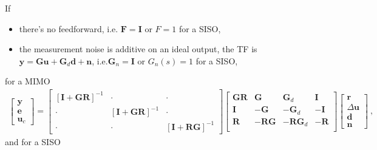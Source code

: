 \documentclass[letterpaper,10pt,english]{jupyterBook}
\begin{document}
\sphinxAtStartPar
{} If
\begin{itemize}
\item {} 
\sphinxAtStartPar
there’s no feed\sphinxhyphen{}forward, i.e. \(\mathbf{F} = \mathbf{I}\) or \(F = 1\) for a SISO,

\item {} 
\sphinxAtStartPar
the measurement noise is additive on an ideal output, the TF is \(\mathbf{y} = \mathbf{G} \mathbf{u} + \mathbf{G}_d \mathbf{d} + \mathbf{n}\), i.e.\(\mathbf{G}_n = \mathbf{I}\) or \(G_n(s) = 1\) for a SISO,

\end{itemize}

\sphinxAtStartPar
for a MIMO
\begin{equation*}
\begin{split}
\begin{bmatrix} \mathbf{y} \\ \mathbf{e} \\ \mathbf{u}_c \end{bmatrix} =
\begin{bmatrix} \left[ \mathbf{I} + \mathbf{G} \mathbf{R} \right]^{-1} & \cdot & \cdot \\ \cdot & \left[ \mathbf{I} + \mathbf{G} \mathbf{R} \right]^{-1} & \cdot \\ \cdot & \cdot & \left[ \mathbf{I} + \mathbf{R} \mathbf{G} \right]^{-1} \end{bmatrix}
\begin{bmatrix}
  \mathbf{G} \mathbf{R} & \mathbf{G} & \mathbf{G}_d & \mathbf{I} \\
             \mathbf{I} & -            \mathbf{G} & -            \mathbf{G}_d & - \mathbf{I} \\
             \mathbf{R} & - \mathbf{R} \mathbf{G} & - \mathbf{R} \mathbf{G}_d & - \mathbf{R} \\
\end{bmatrix}
\begin{bmatrix} \mathbf{r} \\ \Delta \mathbf{u} \\ \mathbf{d} \\ \mathbf{n} \end{bmatrix} \ ,
\end{split}
\end{equation*}
\sphinxAtStartPar
and for a SISO
\end{document}
